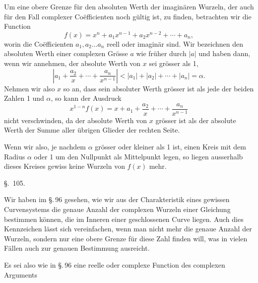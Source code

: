 
Um eine obere Grenze für den absoluten Werth der imaginären Wurzeln, der
auch für den Fall complexer Co\"efficienten noch gültig ist, zu finden,
betrachten wir die Function
\[
f(x)=x^n+a_1x^{n-1}+a_2x^{n-2}+\cdots+a_n,
\]
worin die Co\"efficienten $a_1, a_2\ldots a_n$ reell oder imaginär sind.
Wir bezeichnen den absoluten Werth einer complexen Grösse $a$ wie früher
durch $|a|$ und haben dann, wenn wir annehmen, der absolute Werth von
$x$ sei grösser als 1,
\[
\left| a_1+\frac{a_2}{x}+\cdots+\frac{a_n}{x^{n-1}} \right| <
|a_1|+|a_2|+\cdots+|a_n|=\alpha.
\]
Nehmen wir also $x$ so an, dass sein absoluter Werth grösser ist als
jede der beiden Zahlen 1 und $\alpha$, so kann der Ausdruck
\[
x^{1-n}f(x)=x+a_1+\frac{a_2}{x}+\cdots+\frac{a_n}{x^{n-1}}
\]
nicht verschwinden, da der absolute Werth von $x$ grösser ist als der
absolute Werth der Summe aller übrigen Glieder der rechten Seite.

Wenn wir also, je nachdem $\alpha$ grösser oder kleiner als 1 ist, einen
Kreis mit dem Radius $\alpha$ oder 1 um den Nullpunkt als Mittelpunkt
legen, so liegen ausserhalb dieses Kreises gewiss keine Wurzeln von
$f(x)$ mehr.

\begin{center}
\S.\ 105.

\end{center}

Wir haben im \S.\,96 gesehen, wie wir aus der Charakteristik eines
gewissen Curvensystems die genaue Anzahl der complexen Wurzeln einer
Gleichung bestimmen können, die im Inneren einer geschlossenen Curve
liegen. Auch dies Kennzeichen lässt sich vereinfachen, wenn man nicht
mehr die genaue Anzahl der Wurzeln, sondern nur eine obere Grenze für
diese Zahl finden will, was in vielen Fällen auch zur genauen
Bestimmung ausreicht.

Es sei also wie in \S.\,96
eine reelle oder complexe Function des complexen Arguments

